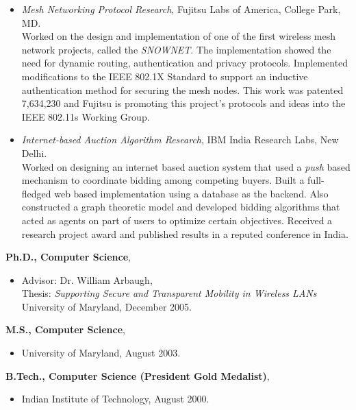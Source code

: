 \begin{resume}
\begin{itemize}
         \item[] {\it Mesh Networking Protocol Research}, Fujitsu Labs of America, College Park, MD.\\
		Worked on the design and implementation of one of the first wireless mesh network projects, called the {\em SNOWNET}.
	        The implementation showed the need for dynamic routing, authentication and privacy protocols. Implemented modifications to the IEEE 802.1X Standard
                to support an inductive authentication method for securing the mesh nodes. This work was patented 7,634,230 and Fujitsu is promoting this project's
                protocols and ideas into the IEEE 802.11s Working Group.
		
         \item[] {\it Internet-based Auction Algorithm Research},  IBM India Research Labs, New Delhi.\\
		Worked on designing an internet based auction system that used a {\em push} based mechanism to
                coordinate bidding among competing buyers. Built a full-fledged web based implementation using a database as the
                backend. Also constructed a graph theoretic model and developed bidding algorithms that
                acted as agents on part of users to optimize certain
		objectives. Received a research project award and published results in a reputed conference in India.
    \end{itemize}

{\bf Ph.D., Computer Science},
    \begin{itemize}
         \item[] Advisor: Dr. William Arbaugh, \\
		 Thesis: {\em Supporting Secure and Transparent Mobility in Wireless LANs} \\
                 University of Maryland, December 2005.
    \end{itemize}

{\bf M.S., Computer Science},   	
    \begin{itemize}
         \item[] University of Maryland, August 2003.
    \end{itemize}

{\bf B.Tech., Computer Science (President Gold Medalist)},
    \begin{itemize}
          \item[] Indian Institute of Technology, August 2000.
    \end{itemize}



\end{resume}
